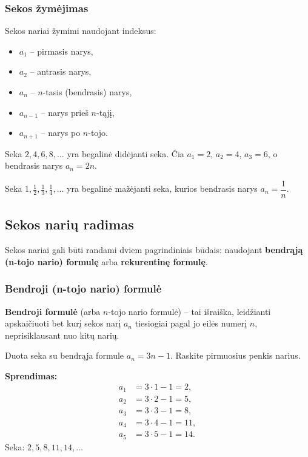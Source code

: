 \subsubsection*{Sekos žymėjimas}

Sekos nariai žymimi naudojant indeksus:
\begin{itemize}
    \item $a_1$ – pirmasis narys,
    \item $a_2$ – antrasis narys,
    \item $a_n$ – $n$-tasis (bendrasis) narys,
    \item $a_{n-1}$ – narys prieš $n$-tąjį,
    \item $a_{n+1}$ – narys po $n$-tojo.
\end{itemize}

\begin{example}
Seka $2, 4, 6, 8, \ldots$ yra begalinė didėjanti seka. Čia $a_1 = 2$, $a_2 = 4$, $a_3 = 6$, o bendrasis narys $a_n = 2n$.
\end{example}

\begin{example}
Seka $1, \tfrac{1}{2}, \tfrac{1}{3}, \tfrac{1}{4}, \ldots$ yra begalinė mažėjanti seka, kurios bendrasis narys $a_n = \dfrac{1}{n}$.
\end{example}

\subsection{Sekos narių radimas}

Sekos nariai gali būti randami dviem pagrindiniais būdais: naudojant \textbf{bendrąją (n-tojo nario) formulę} arba \textbf{rekurentinę formulę}.

\subsubsection*{Bendroji (n-tojo nario) formulė}

\begin{definition}
\textbf{Bendroji formulė} (arba $n$-tojo nario formulė) – tai išraiška, leidžianti apskaičiuoti bet kurį sekos narį $a_n$ tiesiogiai pagal jo eilės numerį $n$, neprisiklausant nuo kitų narių.
\end{definition}

\begin{example}
Duota seka su bendrąja formule $a_n = 3n - 1$. Raskite pirmuosius penkis narius.

\textbf{Sprendimas:}
\begin{align*}
a_1 &= 3 \cdot 1 - 1 = 2, \\
a_2 &= 3 \cdot 2 - 1 = 5, \\
a_3 &= 3 \cdot 3 - 1 = 8, \\
a_4 &= 3 \cdot 4 - 1 = 11, \\
a_5 &= 3 \cdot 5 - 1 = 14.
\end{align*}
Seka: $2, 5, 8, 11, 14, \ldots$
\end{example}

